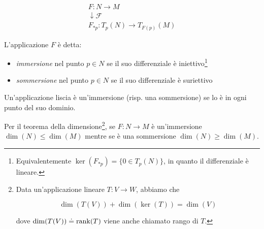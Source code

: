 \begin{gather}
	F : N \to M\\
	\downarrow \mathcal{F} \nonumber\\
	F_{*p} : T_{p}(N) \to T_{F(p)}(M)
\end{gather}

L'applicazione $ F $ è detta:

\begin{itemize}
	\item \textit{immersione} nel punto $ p \in N $ se il suo differenziale è iniettivo\footnote{%
		Equivalentemente $ \ker(F_{*p}) = \{0 \in T_{p}(N)\} $, in quanto il differenziale è lineare.%
	}
	
	\item \textit{sommersione} nel punto $ p \in N $ se il suo differenziale è suriettivo
\end{itemize}

Un'applicazione liscia è un'immersione (risp. una sommersione) se lo è in ogni punto del suo dominio.

\begin{definition}
	Per il teorema della dimensione\footnote{%
		Data un'applicazione lineare $ T : V \to W $, abbiamo che
		
		\begin{equation*}
			\dim(T(V)) + \dim(\ker(T)) = \dim(V)
		\end{equation*}
		
		dove $ \dim(T(V)) \doteq \rank(T) $ viene anche chiamato rango di $ T $.%
	}, se $ F : N \to M $ è un'immersione $ \dim(N) \leqslant \dim(M) $ mentre se è una sommersione $ \dim(N) \geqslant \dim(M) $.
\end{definition}

